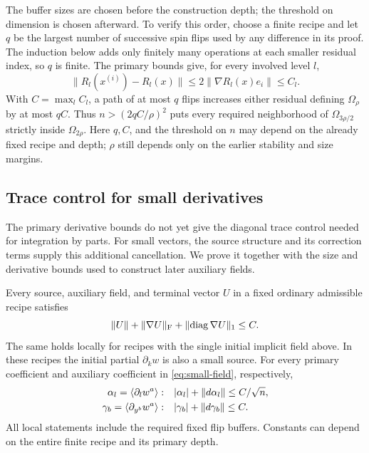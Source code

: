 The buffer sizes are chosen before the construction depth; the threshold
on dimension is chosen afterward. To verify this order, choose a finite
recipe and let $q$ be the largest number of successive spin flips used by
any difference in its proof. The induction below adds only finitely many
operations at each smaller residual index, so $q$ is finite. The primary
bounds give, for every involved level $l$,
\[
 \|R_l(x^{(i)})-R_l(x)\|
 \le 2\|\nabla R_l(x)e_i\|\le C_l.
\]
With $C=\max_l C_l$, a path of at most $q$ flips increases either
residual defining $\Omega_\rho$ by at most $qC$. Thus
$n>(2qC/\rho)^2$ puts every required neighborhood of
$\Omega_{3\rho/2}$ strictly inside $\Omega_{2\rho}$. Here $q,C$, and the
threshold on $n$ may depend on the already fixed recipe and depth;
$\rho$ still depends only on the earlier stability and size margins.

\subsection{Trace control for small derivatives}

The primary derivative bounds do not yet give the diagonal trace control
needed for integration by parts. For small vectors, the source structure
and its correction terms supply this additional cancellation. We prove
it together with the size and derivative bounds used to construct later
auxiliary fields.

\begin{lemma}\label{lem:small-derivatives}
Every source, auxiliary field, and terminal vector $U$ in a fixed ordinary
admissible recipe satisfies
\begin{equation}
 \lVert U\rVert+\lVert \nabla U\rVert_{\mathrm F}
                   +\lVert \operatorname{diag}\nabla U\rVert_1\leq C.
 \label{eq:small-derivative-bound}
\end{equation}
The same holds locally for recipes with the single initial implicit field
above.  In these recipes the initial partial $\partial_k w$ is also a
small source.  For every primary coefficient and auxiliary coefficient
in \eqref{eq:small-field}, respectively,
\begin{equation}
 \begin{split}
 \alpha_l=\langle \partial_lw^a\rangle:&\quad
       |\alpha_l|+\lVert d\alpha_l\rVert\leq C/\sqrt n,\\
 \gamma_b=\langle \partial_{y^b}w^a\rangle:&\quad
       |\gamma_b|+\lVert d\gamma_b\rVert\leq C.
 \end{split}
 \label{eq:small-average-bounds}
\end{equation}
All local statements include the required fixed flip buffers.  Constants
can depend on the entire finite recipe and its primary depth.
\end{lemma}

